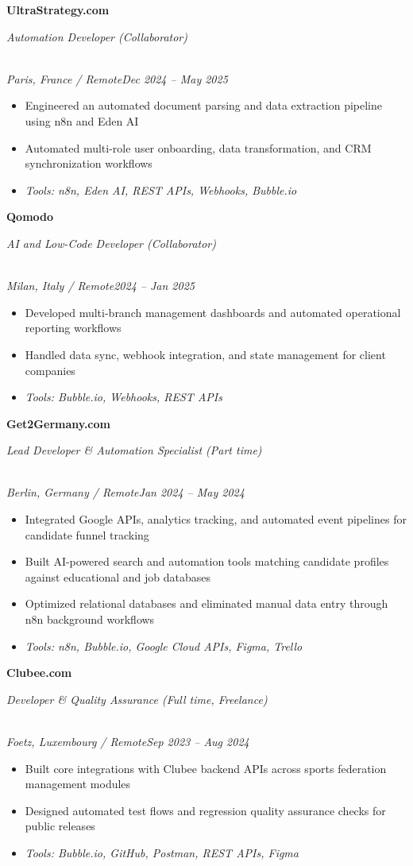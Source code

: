 \documentclass[a4paper,10pt]{article}
\newcommand{\role}[4]{\vspace{2pt}\noindent\hspace{0.6em}\parbox[t]{0.38\textwidth}{\raggedright\textbf{#1}}\hfill\parbox[t]{0.58\textwidth}{\raggedleft\textit{#2}}\\{\textit{#3}\hfill\textit{#4}}\vspace{1pt}}
\begin{document}
\role{UltraStrategy.com}{Automation Developer (Collaborator)}{Paris, France / Remote}{Dec 2024 -- May 2025}
\begin{itemize}
\item Engineered an automated document parsing and data extraction pipeline using n8n and Eden AI
\item Automated multi-role user onboarding, data transformation, and CRM synchronization workflows
\item \textit{Tools: n8n, Eden AI, REST APIs, Webhooks, Bubble.io}
\end{itemize}

\role{Qomodo}{AI and Low-Code Developer (Collaborator)}{Milan, Italy / Remote}{2024 -- Jan 2025}
\begin{itemize}
\item Developed multi-branch management dashboards and automated operational reporting workflows
\item Handled data sync, webhook integration, and state management for client companies
\item \textit{Tools: Bubble.io, Webhooks, REST APIs}
\end{itemize}

\role{Get2Germany.com}{Lead Developer \& Automation Specialist (Part time)}{Berlin, Germany / Remote}{Jan 2024 -- May 2024}
\begin{itemize}
\item Integrated Google APIs, analytics tracking, and automated event pipelines for candidate funnel tracking
\item Built AI-powered search and automation tools matching candidate profiles against educational and job databases
\item Optimized relational databases and eliminated manual data entry through n8n background workflows
\item \textit{Tools: n8n, Bubble.io, Google Cloud APIs, Figma, Trello}
\end{itemize}

\role{Clubee.com}{Developer \& Quality Assurance (Full time, Freelance)}{Foetz, Luxembourg / Remote}{Sep 2023 -- Aug 2024}
\begin{itemize}
\item Built core integrations with Clubee backend APIs across sports federation management modules
\item Designed automated test flows and regression quality assurance checks for public releases
\item \textit{Tools: Bubble.io, GitHub, Postman, REST APIs, Figma}
\end{itemize}
\end{document}

